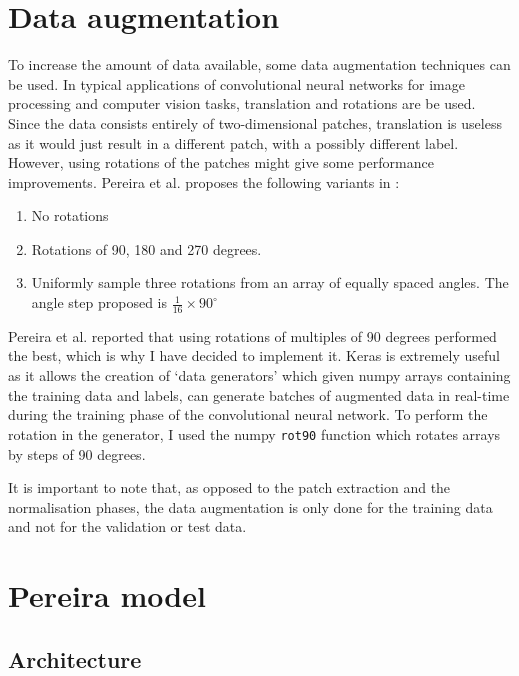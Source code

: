 \documentclass[12pt,a4paper,twoside,openright]{report}
\begin{document}
\section{Data augmentation}
To increase the amount of data available, some data augmentation techniques can be used. In typical applications of convolutional neural networks for image processing and computer vision tasks, translation and rotations are be used. Since the data consists entirely of two-dimensional patches, translation is useless as it would just result in a different patch, with a possibly different label. However, using rotations of the patches might give some performance improvements. Pereira et al. proposes the following variants in \cite{pereira}:
\begin{enumerate}
	\item No rotations
	\item Rotations of 90, 180 and 270 degrees.
	\item Uniformly sample three rotations from an array of equally spaced angles. The angle step proposed is $\frac{1}{16} \times 90^{\circ}$
\end{enumerate}
Pereira et al. reported that using rotations of multiples of 90 degrees performed the best, which is why I have decided to implement it. Keras is extremely useful as it allows the creation of `data generators' which given numpy arrays containing the training data and labels, can generate batches of augmented data in real-time during the training phase of the convolutional neural network. To perform the rotation in the generator, I used the numpy \texttt{rot90} function which rotates arrays by steps of 90 degrees.

It is important to note that, as opposed to the patch extraction and the normalisation phases, the data augmentation is only done for the training data and not for the validation or test data.

\section{Pereira model}

\subsection{Architecture}
\end{document}
